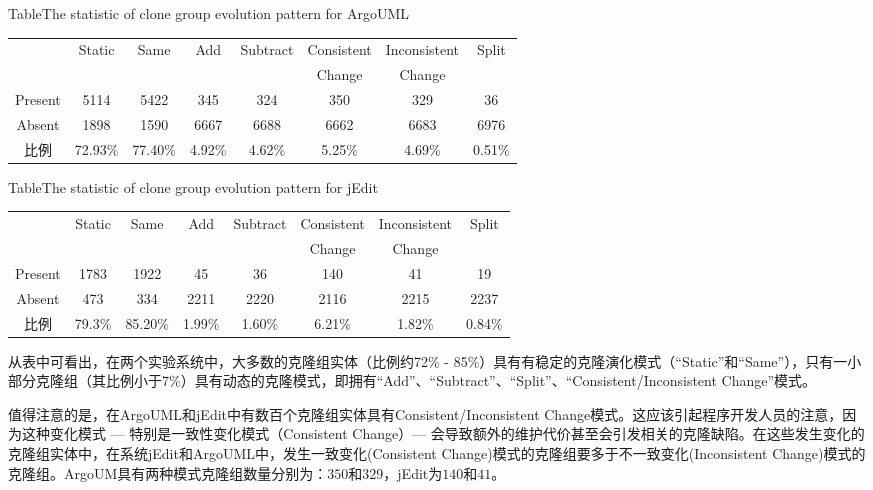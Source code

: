 \begin{table}[htbp]
{Table$\!$}{The statistic of clone group evolution pattern for ArgoUML}
\vspace{0.5em}
\centering
\wuhao
\begin{tabular}{cccccccc}
\toprule[1.5pt]
~&\multirow{2}{*}{Static}&\multirow{2}{*}{Same}&\multirow{2}{*}{Add}&\multirow{2}{*}{Subtract}&Consistent&Inconsistent&\multirow{2}{*}{Split}\\ 
~&&&&&Change&Change&\\ 
\midrule[1pt]
Present	&5114	&5422	&345	&324	&350	&329	&36\\ 
Absent	&1898	&1590	&6667	&6688	&6662	&6683	&6976\\ 
比例	&72.93\%	&77.40\%	&4.92\%	&4.62\%	&5.25\%	&4.69\%	&0.51\%\\ 
\bottomrule[1.5pt]
\end{tabular}
\end{table}

\begin{table}[htbp]
{Table$\!$}{The statistic of clone group evolution pattern for jEdit}
\vspace{0.5em}
\centering
\wuhao
\begin{tabular}{cccccccc}
\toprule[1.5pt]
~&\multirow{2}{*}{Static}&\multirow{2}{*}{Same}&\multirow{2}{*}{Add}&\multirow{2}{*}{Subtract}&Consistent&Inconsistent&\multirow{2}{*}{Split}\\ 
~&&&&&Change&Change&\\ 
\midrule[1pt]
Present	&1783	&1922	&45	&36	&140	&41	&19\\ 
Absent	&473	&334	&2211	&2220	&2116	&2215	&2237\\ 
比例	&79.3\%	&85.20\%	&1.99\%	&1.60\%	&6.21\%	&1.82\%	&0.84\%\\ 
\bottomrule[1.5pt]
\end{tabular}
\end{table}

从表中可看出，在两个实验系统中，大多数的克隆组实体（比例约72\% - 85\%）具有有稳定的克隆演化模式（“Static”和“Same”），只有一小部分克隆组（其比例小于7\%）具有动态的克隆模式，即拥有“Add”、“Subtract”、“Split”、“Consistent/Inconsistent Change”模式。

值得注意的是，在ArgoUML和jEdit中有数百个克隆组实体具有Consistent/Inconsistent Change模式。这应该引起程序开发人员的注意，因为这种变化模式 --- 特别是一致性变化模式（Consistent Change）--- 会导致额外的维护代价甚至会引发相关的克隆缺陷。在这些发生变化的克隆组实体中，在系统jEdit和ArgoUML中，发生一致变化(Consistent Change)模式的克隆组要多于不一致变化(Inconsistent Change)模式的克隆组。ArgoUM具有两种模式克隆组数量分别为：$350$和$329$，jEdit为$140$和$41$。

